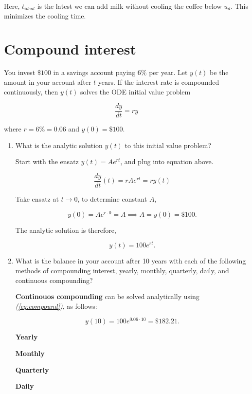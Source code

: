 \documentclass[11pt,oneside]{extarticle}
\newcommand{\Dollar}{\$}
\newcommand{\percent}{\%}
\renewcommand{\eqref}[1]{\textup{\emph{({\ref*{#1}})}}}
\numberwithin{equation}{section}
\numberwithin{figure}{section}
\begin{document}
Here, $t_{ideal}$ is the latest we can add milk without cooling the coffee below
$u_d$. This minimizes the cooling time.

\newpage

\section{Compound interest}

You invest $\Dollar 100$ in a savings account paying $6\percent$ per year. Let
$y(t)$ be the amount in your account after $t$ years. If the interest rate is
compounded continuously, then $y(t)$ solves the ODE initial value problem

$$
\frac{dy}{dt} = ry
$$

where $r=6\percent=0.06$ and $y(0)=\Dollar 100$.

\begin{enumerate}

    \item What is the analytic solution $y(t)$ to this initial value problem?

        Start with the ensatz $y(t)=Ae^{rt}$, and plug into equation above.

        $$
        \frac{dy}{dt}(t) =
        rAe^{rt} = ry(t)
        $$

        Take ensatz at $t\rightarrow 0$, to determine constant $A$,
        
        $$
        y(0)=Ae^{r\cdot 0} = A
        \implies
        A = y(0) = \Dollar 100.
        $$

        The analytic solution is therefore,

        \begin{equation}
            y(t)=100e^{rt}.
            \label{eq:compound}
        \end{equation}

    \item What is the balance in your account after 10 years with each of the
        following methods of compounding interest, yearly, monthly, quarterly,
        daily, and continuous compounding?

        \par {\bf Continouos compounding} can be solved analytically using 
        \eqref{eq:compound}, as follows:

        $$
        y(10) = 100 e^{0.06\cdot 10} = \Dollar182.21.
        $$

        \par {\bf Yearly} 
        
        \par {\bf Monthly} 
        \par {\bf Quarterly} 
        \par {\bf Daily} 
       
\end{enumerate}
\end{document}
